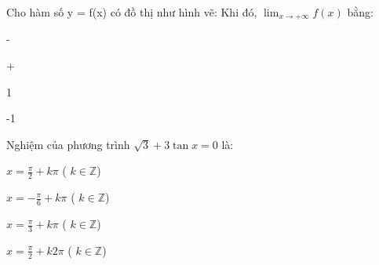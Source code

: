 \begin{question}[type=multiple_choice,difficulty=1,code={I-7}]
Cho hàm số y = f(x) có đồ thị như hình vẽ:
Khi đó, $ \lim_{x \to +\infty} f(x) $ bằng:



\begin{choice}[label=A]
-\infty
\end{choice}

\begin{choice}[label=B]
+\infty
\end{choice}

\begin{choice}[label=C]
1
\end{choice}

\begin{choice}[correct,label=D]
-1
\end{choice}

\end{question}

\begin{question}[type=multiple_choice,difficulty=2,code={I-8}]
Nghiệm của phương trình $ \sqrt{3} + 3 \tan x = 0 $ là:

\begin{choice}[label=A]
$ x = \frac{\pi}{2} + k\pi $ ( $ k \in \mathbb{Z} $)
\end{choice}

\begin{choice}[correct,label=B]
$ x = -\frac{\pi}{6} + k\pi $ ( $ k \in \mathbb{Z} $)
\end{choice}

\begin{choice}[label=C]
$ x = \frac{\pi}{3} + k\pi $ ( $ k \in \mathbb{Z} $)
\end{choice}

\begin{choice}[label=D]
$ x = \frac{\pi}{2} + k2\pi $ ( $ k \in \mathbb{Z} $)
\end{choice}

\end{question}

